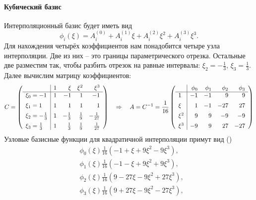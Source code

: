 \paragraph{Кубический базис}
Интерполяционный базис будет иметь вид
$$
\phi_i(\xi) = A_i^{(0)} + A_i^{(1)} \xi + A_i^{(2)} \xi^2 + A_i^{(3)} \xi^3.
$$
Для нахождения четырёх коэффициентов нам понадобится четыре узла интерполяции.
Две из них -- это границы параметрического отрезка. Остальные две разместим
так, чтобы разбить отрезок на равные интервалы:
$\xi_2 = -\tfrac13$, $\xi_3 = \tfrac13$.
Далее вычислим матрицу коэффициентов:
$$
C =
\left(
\begin{array}{l|rrrr}
                  &  1  &  \xi      & \xi^2     & \xi^3         \\
\hline
\xi_0 = -1        &  1  & -1        & 1         &  -1           \\[5pt]
\xi_1 =  1        &  1  & 1         & 1         &   1           \\[5pt]
\xi_2 = -\tfrac13 &  1  & -\tfrac13 & \tfrac19  &  -\tfrac1{27} \\[5pt]
\xi_3 =  \tfrac13 &  1  &  \tfrac13 & \tfrac19  &   \tfrac1{27}
\end{array}
\right)
\quad\Rightarrow\quad
A = C^{-1} =
\frac{1}{16}
\left(
\begin{array}{l|rrrr}
      & \phi_0 & \phi_1 & \phi_2 & \phi_3 \\
\hline
1     & -1     & -1     &   9    &  9     \\[5pt]
\xi   &  1     & -1     & -27    &  27    \\[5pt]
\xi^2 &  9     &  9     & -9     & -9     \\[5pt]
\xi^3 & -9     &  9     &  27    & -27   
\end{array}
\right)
$$
Узловые базисные функции для квадратичной интерполяции примут вид ()
\begin{equation}
\label{eq:segment_cubic_basis}
\begin{aligned}
&\phi_0(\xi)\frac{1}{16}\left(-1 + \xi + 9 \xi^2 -9 \xi^3\right), \\
&\phi_1(\xi)\frac{1}{16}\left(-1 - \xi + 9 \xi^2 +9 \xi^3\right), \\
&\phi_2(\xi)\frac{1}{16}\left(9 -27 \xi - 9\xi^2 + 27 \xi^3\right), \\
&\phi_3(\xi)\frac{1}{16}\left(9 +27 \xi - 9\xi^2 - 27 \xi^3\right), \\
\end{aligned}
\end{equation}

